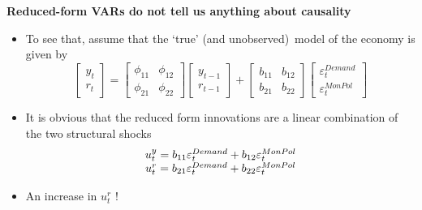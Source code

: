 \begin{frame}
{\textbf{Reduced-form VARs do not tell us anything about causality}}

\begin{itemize}
\item To see that, assume that the `true' (and unobserved)\ model of the
economy is given by%
\begin{equation*}
\begin{bmatrix}
y_{t} \\ 
r_{t}%
\end{bmatrix}%
=\left[ 
\begin{array}{cc}
\phi _{11} & \phi _{12} \\ 
\phi _{21} & \phi _{22}%
\end{array}%
\right] 
\begin{bmatrix}
y_{t-1} \\ 
r_{t-1}%
\end{bmatrix}%
+\left[ 
\begin{array}{cc}
b_{11} & b_{12} \\ 
b_{21} & b_{22}%
\end{array}%
\right] 
\begin{bmatrix}
\varepsilon _{t}^{Demand} \\ 
\varepsilon _{t}^{MonPol}%
\end{bmatrix}%
\end{equation*}
\pause

\item It is obvious that the reduced form innovations are a linear
combination of the two structural shocks%
\begin{equation*}
\begin{array}{c}
u_{t}^{y}=b_{11}\varepsilon _{t}^{Demand}+b_{12}\varepsilon _{t}^{MonPol}{%
\mathbf{\medskip }} \\ 
u_{t}^{r}=b_{21}\varepsilon _{t}^{Demand}+b_{22}\varepsilon _{t}^{MonPol}%
\end{array}%
\end{equation*}%
\pause

\item An increase in $u_{t}^{r}$ {%
}!%
\end{itemize}
\end{frame}

